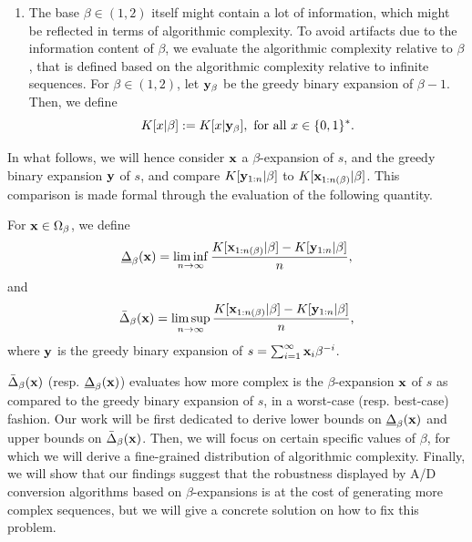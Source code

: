 \begin{enumerate}[label=(\alph*)]
		\item The base $\beta \in (1,2)$ itself might contain a lot of information, which might be reflected in terms of algorithmic complexity. To avoid artifacts due to the information content of $\beta$, we evaluate the algorithmic complexity relative to $\beta$, that is defined based on the algorithmic complexity relative to infinite sequences. For $\beta \in (1,2)$, let ${\bf y}_\beta$ be the greedy binary expansion of $\beta -1$. Then, we define 
		\begin{equation}\label{eq:algorithmic complexity relatively to beta}
			K[x|\beta] := K[x | {\bf y}_\beta], \ \text{for all} \ x \in \{0,1\}^\ast.
		\end{equation}
	\end{enumerate}
	In what follows, we will hence consider ${\bf x}$ a $\beta$-expansion of $s$, and the greedy binary expansion ${\bf y}$ of $s$, and compare $K[{\bf y}_{1:n}|\beta]$ to $K[{\bf x}_{1:n(\beta)}|\beta]$. This comparison is made formal through the evaluation of the following quantity.
	\begin{definition}
		For ${\bf x} \in \Omega_\beta$, we define
		\begin{equation}
			\underline\Delta_\beta({\bf x}) = \liminf_{n \to \infty}\frac{K[{\bf x}_{1:n(\beta)}|\beta] - K[{\bf y}_{1:n}|\beta]}{n},
		\end{equation}
		and
		\begin{equation}
			\bar\Delta_\beta({\bf x}) = \limsup_{n \to \infty}\frac{K[{\bf x}_{1:n(\beta)}|\beta] - K[{\bf y}_{1:n}|\beta]}{n},
		\end{equation}
		where ${\bf y}$ is the greedy binary expansion of $s = \sum_{i=1}^\infty {\bf x}_i \beta^{-i}$.
	\end{definition}
	$\bar\Delta_\beta({\bf x})$ (resp. $\underline\Delta_\beta({\bf x})$) evaluates how more complex is the $\beta$-expansion ${\bf x}$ of $s$ as compared to the greedy binary expansion of $s$, in a worst-case (resp. best-case) fashion. Our work will be first dedicated to derive lower bounds on $\underline\Delta_\beta({\bf x})$ and upper bounds on $\bar\Delta_\beta({\bf x})$. Then, we will focus on certain specific values of $\beta$, for which we will derive a fine-grained distribution of algorithmic complexity. Finally, we will show that our findings suggest that the robustness displayed by A/D conversion algorithms based on $\beta$-expansions is at the cost of generating more complex sequences, but we will give a concrete solution on how to fix this problem.
	
